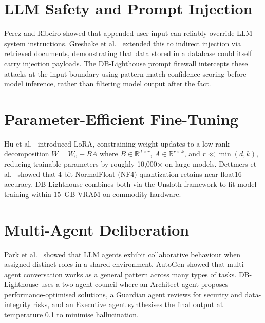 \documentclass[12pt,a4paper]{report}
\begin{document}
\section{LLM Safety and Prompt Injection}

Perez and Ribeiro \cite{perez2022ignore} showed that appended user input can reliably override LLM system instructions. Greshake et al.\ \cite{greshake2023indirect} extended this to indirect injection via retrieved documents, demonstrating that data stored in a database could itself carry injection payloads. The DB-Lighthouse prompt firewall intercepts these attacks at the input boundary using pattern-match confidence scoring before model inference, rather than filtering model output after the fact.

\section{Parameter-Efficient Fine-Tuning}

Hu et al.\ \cite{hu2022lora} introduced LoRA, constraining weight updates to a low-rank decomposition $W = W_0 + BA$ where $B \in \mathbb{R}^{d \times r}$, $A \in \mathbb{R}^{r \times k}$, and $r \ll \min(d,k)$, reducing trainable parameters by roughly 10,000$\times$ on large models. Dettmers et al.\ \cite{dettmers2023qlora} showed that 4-bit NormalFloat (NF4) quantization retains near-float16 accuracy. DB-Lighthouse combines both via the Unsloth framework \cite{han2024unsloth} to fit model training within 15~GB VRAM on commodity hardware.

\section{Multi-Agent Deliberation}

Park et al.\ \cite{park2023generative} showed that LLM agents exhibit collaborative behaviour when assigned distinct roles in a shared environment. AutoGen \cite{wu2023autogen} showed that multi-agent conversation works as a general pattern across many types of tasks. DB-Lighthouse uses a two-agent council where an Architect agent proposes performance-optimised solutions, a Guardian agent reviews for security and data-integrity risks, and an Executive agent synthesises the final output at temperature 0.1 to minimise hallucination.

\end{document}
